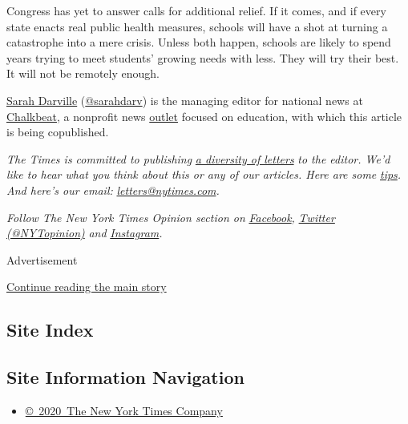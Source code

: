 Congress has yet to answer calls for additional relief. If it comes, and
if every state enacts real public health measures, schools will have a
shot at turning a catastrophe into a mere crisis. Unless both happen,
schools are likely to spend years trying to meet students' growing needs
with less. They will try their best. It will not be remotely enough.

\href{https://www.chalkbeat.org/authors/sarah-darville}{Sarah Darville}
(\href{https://twitter.com/sarahdarv?lang=en}{@sarahdarv}) is the
managing editor for national news at
\href{https://www.chalkbeat.org/}{Chalkbeat}, a nonprofit news
\href{https://www.chalkbeat.org/pages/newsletters}{outlet} focused on
education, with which this article is being copublished.

\emph{The Times is committed to publishing}
\href{https://www.nytimes.com/2019/01/31/opinion/letters/letters-to-editor-new-york-times-women.html}{\emph{a
diversity of letters}} \emph{to the editor. We'd like to hear what you
think about this or any of our articles. Here are some}
\href{https://help.nytimes.com/hc/en-us/articles/115014925288-How-to-submit-a-letter-to-the-editor}{\emph{tips}}\emph{.
And here's our email:}
\href{mailto:letters@nytimes.com}{\emph{letters@nytimes.com}}\emph{.}

\emph{Follow The New York Times Opinion section on}
\href{https://www.facebook.com/nytopinion}{\emph{Facebook}}\emph{,}
\href{http://twitter.com/NYTOpinion}{\emph{Twitter (@NYTopinion)}}
\emph{and}
\href{https://www.instagram.com/nytopinion/}{\emph{Instagram}}\emph{.}

Advertisement

\protect\hyperlink{after-bottom}{Continue reading the main story}

\hypertarget{site-index}{%
\subsection{Site Index}\label{site-index}}

\hypertarget{site-information-navigation}{%
\subsection{Site Information
Navigation}\label{site-information-navigation}}

\begin{itemize}
\tightlist
\item
  \href{https://help.nytimes.com/hc/en-us/articles/115014792127-Copyright-notice}{©~2020~The
  New York Times Company}
\end{itemize}


